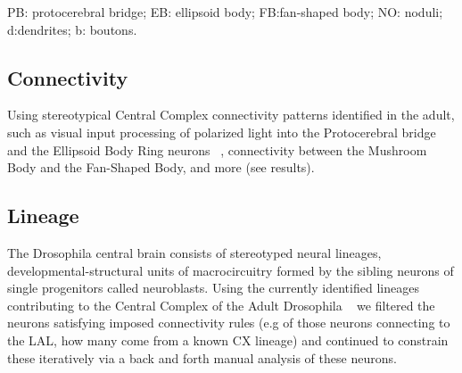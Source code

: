 \documentclass{article}
\begin{document}
 PB: protocerebral bridge; EB: ellipsoid body; FB:fan-shaped body; NO: noduli; d:dendrites; b: boutons. 
 
 
 \subsection{Connectivity}
    Using stereotypical Central Complex connectivity patterns identified in the adult, such as visual input processing  of polarized light into the Protocerebral bridge and the Ellipsoid Body Ring neurons ~\citep{hardcastle2021visual, lin2013comprehensive, hulse2021connectome}, connectivity between the Mushroom Body and the Fan-Shaped Body, and more (see results). 

 \subsection{Lineage}
 The Drosophila central brain consists of stereotyped neural lineages, developmental-structural units of macrocircuitry formed by the sibling neurons of single progenitors called neuroblasts. %
 Using the currently identified lineages contributing to the Central Complex of the Adult Drosophila ~\citep{andrade2019developmentally}%
 we filtered the neurons satisfying imposed connectivity rules (e.g of those neurons connecting to the LAL, how many come from a known CX lineage) and continued to constrain these iteratively via a back and forth manual analysis of these neurons. 
\end{document}
